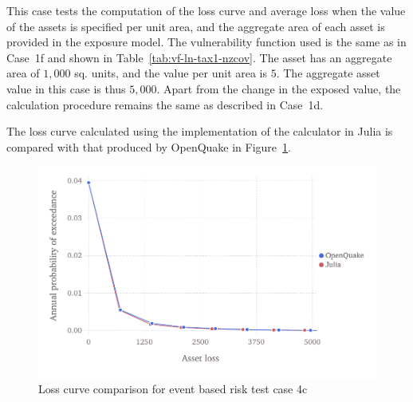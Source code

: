 This case tests the computation of the loss curve and average loss when the value of the assets is specified per unit area, and the aggregate area of each asset is provided in the exposure model. The vulnerability function used is the same as in Case~1f and shown in Table~\ref{tab:vf-ln-tax1-nzcov}. The asset has an aggregate area of $1,000$ sq. units, and the value per unit area is $5$. The aggregate asset value in this case is thus $5,000$. Apart from the change in the exposed value, the calculation procedure remains the same as described in Case~1d.

The loss curve calculated using the implementation of the calculator in Julia is compared with that produced by OpenQuake in Figure~\ref{fig:lc-ebr-4c}.

\begin{figure}[htbp]
\centering
\includegraphics[width=12cm]{qareport/figures/fig-lc-ebr-4c}
\caption{Loss curve comparison for event based risk test case 4c}
\label{fig:lc-ebr-4c}
\end{figure}